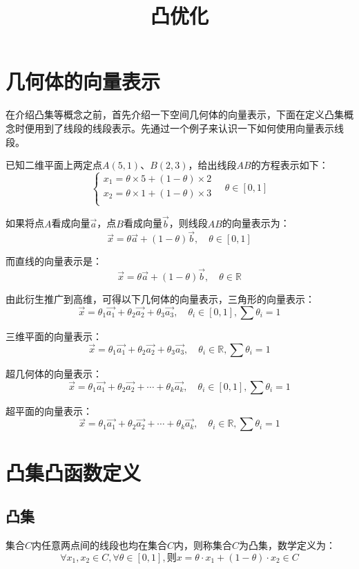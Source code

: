 \documentclass[12pt]{article}
\title{凸优化\cite{Understand_Convex_Optimization_In_One_Article}}
\begin{document}
\maketitle

\section{几何体的向量表示}
在介绍凸集等概念之前，首先介绍一下空间几何体的向量表示，下面在定义凸集概念时便用到了线段的线段表示。先通过一个例子来认识一下如何使用向量表示线段。

已知二维平面上两定点$A(5, 1)$、$B(2,3)$，给出线段$AB$的方程表示如下：
$$
\begin{cases}
x_1 = \theta \times 5 + (1 - \theta) \times 2 \\
x_2 = \theta \times 1 + (1 - \theta) \times 3 \\
\end{cases}
\quad \theta \in [0, 1]
$$

如果将点$A$看成向量$\vec{a}$，点$B$看成向量$\vec{b}$，则线段$AB$的向量表示为：
$$
\vec{x} = \theta \vec{a} + (1-\theta) \vec{b}, \quad \theta \in [0,1]
$$

而直线的向量表示是：
$$
\vec{x} = \theta \vec{a} + (1-\theta) \vec{b}, \quad \theta \in \mathbb{R}
$$

由此衍生推广到高维，可得以下几何体的向量表示，三角形的向量表示：
$$
\vec{x} = \theta_1 \vec{a_1} + \theta_2 \vec{a_2} + \theta_3 \vec{a_3}, \quad \theta_i \in [0,1], \sum\theta_i = 1
$$

三维平面的向量表示：
$$
\vec{x} = \theta_1 \vec{a_1} + \theta_2 \vec{a_2} + \theta_3 \vec{a_3}, \quad \theta_i \in \mathbb{R}, \sum\theta_i = 1
$$

超几何体的向量表示：
$$
\vec{x} = \theta_1 \vec{a_1} + \theta_2 \vec{a_2} + \cdots + \theta_k \vec{a_k}, \quad \theta_i \in [0,1], \sum\theta_i = 1
$$

超平面的向量表示：
$$
\vec{x} = \theta_1 \vec{a_1} + \theta_2 \vec{a_2} + \cdots +  \theta_k \vec{a_k}, \quad \theta_i \in \mathbb{R}, \sum\theta_i = 1
$$

\section{凸集凸函数定义}
\subsection{凸集}
集合$C$内任意两点间的线段也均在集合$C$内，则称集合$C$为凸集，数学定义为：
$$
\forall x_1,x_2 \in C, \forall \theta \in [0,1], \text{则} x = \theta\cdot x_1 + (1-\theta)\cdot x_2 \in C
$$
\end{document}
